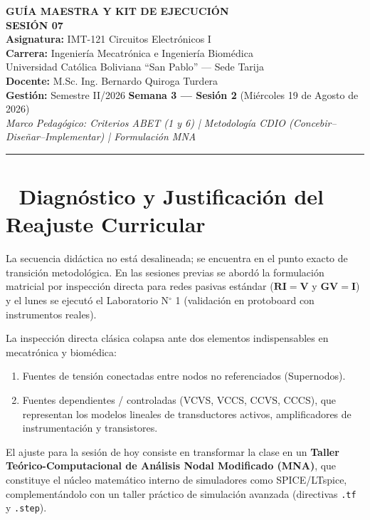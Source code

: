 \documentclass[11pt, a4paper]{article}
\begin{document}
\begin{center}
    {\LARGE \textbf{GUÍA MAESTRA Y KIT DE EJECUCIÓN}} \\[0.2cm]
    {\Large \textbf{SESIÓN 07}} \\[0.4cm]
    \normalsize
    \textbf{Asignatura:} IMT-121 Circuitos Electrónicos I \\
    \textbf{Carrera:} Ingeniería Mecatrónica e Ingeniería Biomédica \\
    Universidad Católica Boliviana ``San Pablo'' — Sede Tarija \\[0.2cm]
    \textbf{Docente:} M.Sc. Ing. Bernardo Quiroga Turdera \\
    \textbf{Gestión:} Semestre II/2026 \hspace{0.5cm} \textbf{Semana 3 — Sesión 2} (Miércoles 19 de Agosto de 2026) \\[0.2cm]
    \textit{Marco Pedagógico: Criterios ABET (1 y 6) | Metodología CDIO (Concebir–Diseñar–Implementar) | Formulación MNA}
    \vspace{0.3cm}
\end{center}

\hrule
\vspace{0.4cm}

\section*{📌 Diagnóstico y Justificación del Reajuste Curricular}
\begin{tcolorbox}[caja_diagnostico, title=Transición Metodológica]
La secuencia didáctica no está desalineada; se encuentra en el punto exacto de transición metodológica. En las sesiones previas se abordó la formulación matricial por inspección directa para redes pasivas estándar ($\mathbf{R}\mathbf{I}=\mathbf{V}$ y $\mathbf{G}\mathbf{V}=\mathbf{I}$) y el lunes se ejecutó el Laboratorio N$^\circ$ 1 (validación en protoboard con instrumentos reales).

La inspección directa clásica colapsa ante dos elementos indispensables en mecatrónica y biomédica:
\begin{enumerate}
    \item Fuentes de tensión conectadas entre nodos no referenciados (Supernodos).
    \item Fuentes dependientes / controladas (VCVS, VCCS, CCVS, CCCS), que representan los modelos lineales de transductores activos, amplificadores de instrumentación y transistores.
\end{enumerate}
El ajuste para la sesión de hoy consiste en transformar la clase en un \textbf{Taller Teórico-Computacional de Análisis Nodal Modificado (MNA)}, que constituye el núcleo matemático interno de simuladores como SPICE/LTspice, complementándolo con un taller práctico de simulación avanzada (directivas \texttt{.tf} y \texttt{.step}).
\end{tcolorbox}
\end{document}
